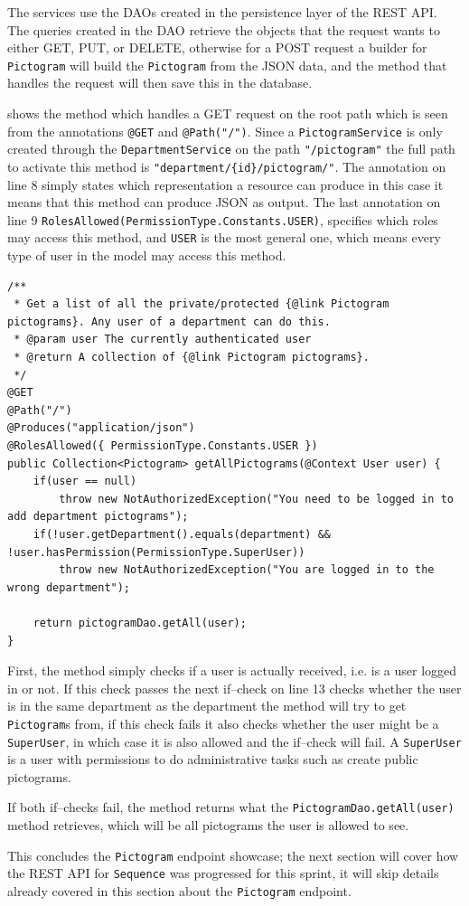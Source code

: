 The services use the DAOs created in the persistence layer of the REST API.
The queries created in the DAO retrieve the objects that the request wants to either GET, PUT, or DELETE, otherwise for a POST request a builder for \texttt{Pictogram} will build the \texttt{Pictogram} from the JSON data, and the method that handles the request will then save this in the database.

 shows the method which handles a GET request on the root path which is seen from the annotations \texttt{@GET} and \texttt{@Path("/")}.
Since a \texttt{PictogramService} is only created through the \texttt{DepartmentService} on the path \texttt{"/pictogram"} the full path to activate this method is \texttt{"department/\{id\}/pictogram/"}.
The annotation on line 8 simply states which representation a resource can produce in this case it means that this method can produce JSON as output.
The last annotation on line 9 \texttt{RolesAllowed({PermissionType.Constants.USER})}, specifies which roles may access this method, and \texttt{USER} is the most general one, which means every type of user in the model may access this method.

\begin{lstlisting}[float, floatplacement=h, caption={A GET request to get all pictograms for a department.},label={lst:getallPictograms}]
/**
 * Get a list of all the private/protected {@link Pictogram pictograms}. Any user of a department can do this.
 * @param user The currently authenticated user
 * @return A collection of {@link Pictogram pictograms}.
 */
@GET
@Path("/")
@Produces("application/json")
@RolesAllowed({ PermissionType.Constants.USER })
public Collection<Pictogram> getAllPictograms(@Context User user) {
    if(user == null)
        throw new NotAuthorizedException("You need to be logged in to add department pictograms");
    if(!user.getDepartment().equals(department) && !user.hasPermission(PermissionType.SuperUser))
        throw new NotAuthorizedException("You are logged in to the wrong department");

    return pictogramDao.getAll(user);
}
\end{lstlisting}

First, the method simply checks if a user is actually received, i.e. is a user logged in or not.
If this check passes the next if--check on line 13 checks whether the user is in the same department as the department the method will try to get \texttt{Pictogram}s from, if this check fails it also checks whether the user might be a \texttt{SuperUser}, in which case it is also allowed and the if--check will fail.
A \texttt{SuperUser} is a user with permissions to do administrative tasks such as create public pictograms.

If both if--checks fail, the method returns what the \texttt{PictogramDao.getAll(user)} method retrieves, which will be all pictograms the user is allowed to see.

This concludes the \texttt{Pictogram} endpoint showcase; the next section will cover how the REST API for \texttt{Sequence} was progressed for this sprint, it will skip details already covered in this section about the \texttt{Pictogram} endpoint.
